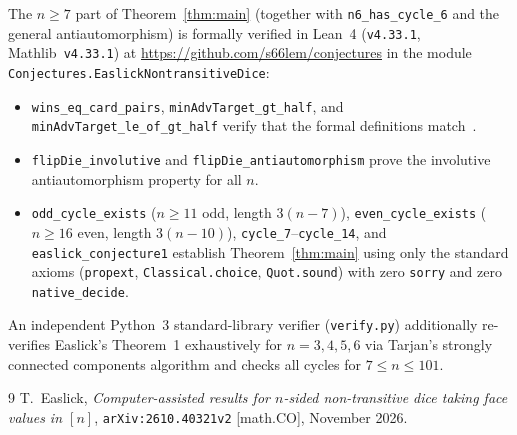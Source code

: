 \documentclass[11pt]{article}
\begin{document}
The $n \ge 7$ part of Theorem~\ref{thm:main} (together with \texttt{n6\_has\_cycle\_6} and the general antiautomorphism) is formally verified in Lean~4 (\texttt{v4.33.1}, Mathlib~\texttt{v4.33.1}) at \url{https://github.com/s66lem/conjectures} in the module \texttt{Conjectures.EaslickNontransitiveDice}:
\begin{itemize}
  \item \texttt{wins\_eq\_card\_pairs}, \texttt{minAdvTarget\_gt\_half}, and \texttt{minAdvTarget\_le\_of\_gt\_half} verify that the formal definitions match~\cite[Equations~(1)--(5)]{easlick2026}.
  \item \texttt{flipDie\_involutive} and \texttt{flipDie\_antiautomorphism} prove the involutive antiautomorphism property for all $n$.
  \item \texttt{odd\_cycle\_exists} ($n \ge 11$ odd, length $3(n-7)$), \texttt{even\_cycle\_exists} ($n \ge 16$ even, length $3(n-10)$), \texttt{cycle\_7}--\texttt{cycle\_14}, and \texttt{easlick\_conjecture1} establish Theorem~\ref{thm:main} using only the standard axioms (\texttt{propext}, \texttt{Classical.choice}, \texttt{Quot.sound}) with zero \texttt{sorry} and zero \texttt{native\_decide}.
\end{itemize}
An independent Python~3 standard-library verifier (\texttt{verify.py}) additionally re-verifies Easlick's Theorem~1 exhaustively for $n = 3, 4, 5, 6$ via Tarjan's strongly connected components algorithm and checks all cycles for $7 \le n \le 101$.

\begin{thebibliography}{9}
T.~Easlick, \emph{Computer-assisted results for $n$-sided non-transitive dice taking face values in $[n]$}, \texttt{arXiv:2610.40321v2} [math.CO], November 2026.
\end{thebibliography}
\end{document}
